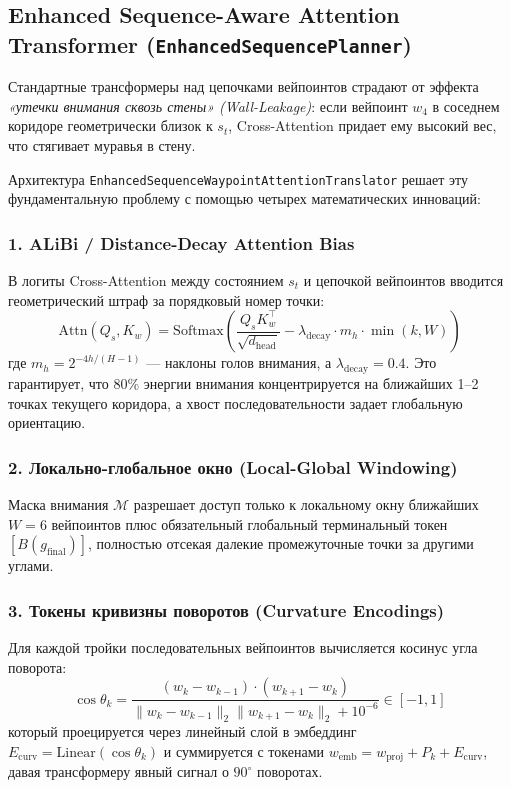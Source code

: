 \subsection{Enhanced Sequence-Aware Attention Transformer (\texttt{EnhancedSequencePlanner})}
Стандартные трансформеры над цепочками вейпоинтов страдают от эффекта \textit{«утечки внимания сквозь стены» (Wall-Leakage)}: если вейпоинт $w_4$ в соседнем коридоре геометрически близок к $s_t$, Cross-Attention придает ему высокий вес, что стягивает муравья в стену.

Архитектура \texttt{EnhancedSequenceWaypointAttentionTranslator} решает эту фундаментальную проблему с помощью четырех математических инноваций:

\subsubsection{1. ALiBi / Distance-Decay Attention Bias}
В логиты Cross-Attention между состоянием $s_t$ и цепочкой вейпоинтов вводится геометрический штраф за порядковый номер точки:
\begin{equation}
    \text{Attn}(Q_s, K_w) = \text{Softmax}\left(\frac{Q_s K_w^\top}{\sqrt{d_{\text{head}}}} - \lambda_{\text{decay}} \cdot m_h \cdot \min(k, W)\right)
\end{equation}
где $m_h = 2^{-4h/(H-1)}$ — наклоны голов внимания, а $\lambda_{\text{decay}} = 0.4$. Это гарантирует, что 80\% энергии внимания концентрируется на ближайших 1--2 точках текущего коридора, а хвост последовательности задает глобальную ориентацию.

\subsubsection{2. Локально-глобальное окно (Local-Global Windowing)}
Маска внимания $\mathcal{M}$ разрешает доступ только к локальному окну ближайших $W=6$ вейпоинтов плюс обязательный глобальный терминальный токен $[B(g_{\text{final}})]$, полностью отсекая далекие промежуточные точки за другими углами.

\subsubsection{3. Токены кривизны поворотов (Curvature Encodings)}
Для каждой тройки последовательных вейпоинтов вычисляется косинус угла поворота:
\begin{equation}
    \cos \theta_k = \frac{(w_k - w_{k-1}) \cdot (w_{k+1} - w_k)}{\|w_k - w_{k-1}\|_2 \|w_{k+1} - w_k\|_2 + 10^{-6}} \in [-1, 1]
\end{equation}
который проецируется через линейный слой в эмбеддинг $E_{\text{curv}} = \text{Linear}(\cos \theta_k)$ и суммируется с токенами $w_{\text{emb}} = w_{\text{proj}} + P_k + E_{\text{curv}}$, давая трансформеру явный сигнал о $90^\circ$ поворотах.


